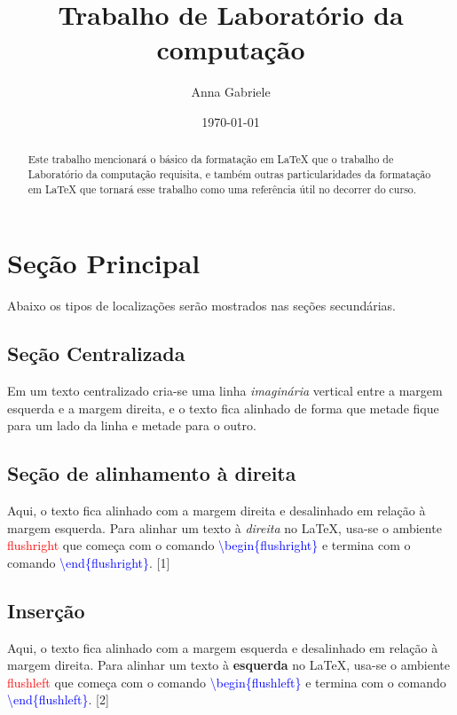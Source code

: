 \documentclass{article}
\begin{document}
\title{Trabalho de Laboratório da computação}
\author{Anna Gabriele}
\date{\today}
\maketitle

\begin{abstract}
Este trabalho mencionará o básico da formatação em \LaTeX{} que o trabalho de Laboratório da computação requisita, e também outras particularidades da formatação em \LaTeX{} que tornará esse trabalho como uma referência útil no decorrer do curso.
\end{abstract}

\tableofcontents
\clearpage

\section{Seção Principal}
Abaixo os tipos de localizações serão mostrados nas seções secundárias.

\subsection{Seção Centralizada}
\begin{center}
Em um texto centralizado cria-se uma linha \textit{imaginária} vertical entre a margem esquerda e a margem direita, e o texto fica alinhado de forma que metade fique para um lado da linha e metade para o outro.
\end{center}

\subsection{Seção de alinhamento à direita}
\begin{flushright}
Aqui, o texto fica alinhado com a margem direita e desalinhado em relação à margem esquerda. Para alinhar um texto à \textit{direita} no \LaTeX{}, usa-se o ambiente  \textcolor{red}{flushright} que começa com o comando \textcolor{blue}{\textbackslash begin\{flushright\} } e termina com o comando  \textcolor{blue}{\textbackslash end\{flushright\}}. [1]
\end{flushright}

\subsection{Inserção}
\begin{flushleft}
Aqui, o texto fica alinhado com a margem esquerda e desalinhado em relação à margem direita. Para alinhar um texto à \textbf{esquerda} no \LaTeX{}, usa-se o ambiente  \textcolor{red}{flushleft} que começa com o comando \textcolor{blue}{\textbackslash begin\{flushleft\} } e termina com o comando  \textcolor{blue}{\textbackslash end\{flushleft\}}. [2]
\end{flushleft}
\end{document}
